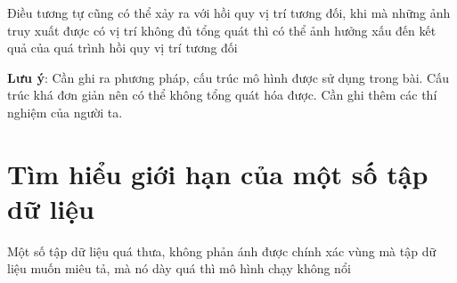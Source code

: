 Điều tương tự cũng có thể xảy ra với hồi quy vị trí tương đối, khi mà những ảnh truy xuất được có vị trí không đủ tổng quát thì có thể ảnh hưởng xấu đến kết quả của quá trình hồi quy vị trí tương đối

\textbf{Lưu ý}: Cần ghi ra phương pháp, cấu trúc mô hình được sử dụng trong bài. Cấu trúc khá đơn giản nên có thể không tổng quát hóa được. Cần ghi thêm các thí nghiệm của người ta.

\section{Tìm hiểu giới hạn của một số tập dữ liệu}
Một số tập dữ liệu quá thưa, không phản ánh được chính xác vùng mà tập dữ liệu muốn miêu tả, mà nó dày quá thì mô hình chạy không nổi\cite{berton2022rethinking} 
